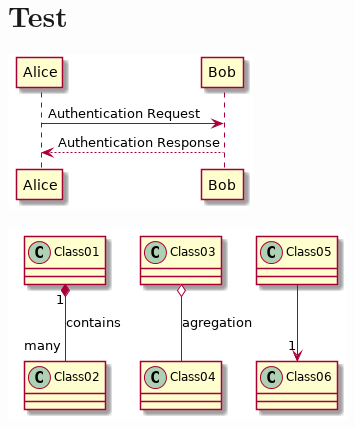 \documentclass[11pt]{article}
\date{\today}
\title{}
\begin{document}
\tableofcontents

\section{Test}
\label{sec:org1f8b6d4}
\begin{center}
\includegraphics[width=.9\linewidth]{tryout.png}
\end{center}

\begin{center}
\includegraphics[width=.9\linewidth]{tryout2.png}
\end{center}
\end{document}
